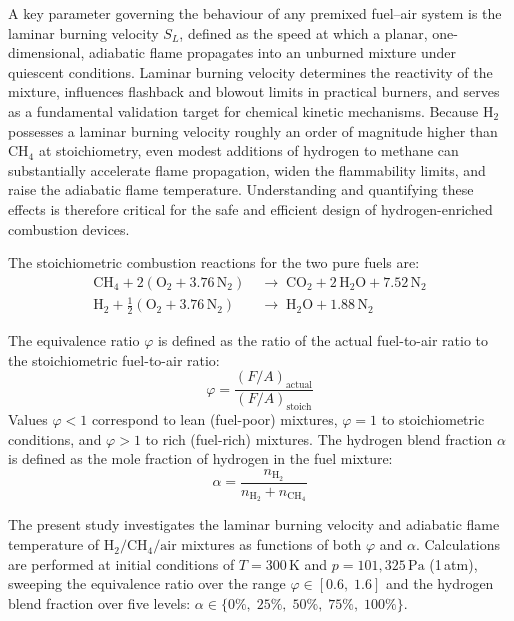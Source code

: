 \documentclass[12pt,a4paper]{article}
\newcommand{\phisym}{\varphi}
\newcommand{\alphasym}{\alpha}
\begin{document}
A key parameter governing the behaviour of any premixed fuel--air system is the laminar burning velocity \(S_L\), defined as the speed at which a planar, one-dimensional, adiabatic flame propagates into an unburned mixture under quiescent conditions. Laminar burning velocity determines the reactivity of the mixture, influences flashback and blowout limits in practical burners, and serves as a fundamental validation target for chemical kinetic mechanisms. Because \(\mathrm{H_2}\) possesses a laminar burning velocity roughly an order of magnitude higher than \(\mathrm{CH_4}\) at stoichiometry, even modest additions of hydrogen to methane can substantially accelerate flame propagation, widen the flammability limits, and raise the adiabatic flame temperature. Understanding and quantifying these effects is therefore critical for the safe and efficient design of hydrogen-enriched combustion devices.

The stoichiometric combustion reactions for the two pure fuels are:
\begin{align}
    \mathrm{CH_4} + 2\left(\mathrm{O_2} + 3.76\,\mathrm{N_2}\right) &\;\longrightarrow\;
    \mathrm{CO_2} + 2\,\mathrm{H_2O} + 7.52\,\mathrm{N_2} \label{eq:ch4} \\[4pt]
    \mathrm{H_2} + \tfrac{1}{2}\left(\mathrm{O_2} + 3.76\,\mathrm{N_2}\right) &\;\longrightarrow\;
    \mathrm{H_2O} + 1.88\,\mathrm{N_2} \label{eq:h2}
\end{align}

The equivalence ratio \(\phisym\) is defined as the ratio of the actual fuel-to-air ratio to the stoichiometric fuel-to-air ratio:
\begin{equation}
    \phisym = \frac{(F/A)_{\text{actual}}}{(F/A)_{\text{stoich}}}
    \label{eq:phi}
\end{equation}
Values \(\phisym < 1\) correspond to lean (fuel-poor) mixtures, \(\phisym = 1\) to stoichiometric conditions, and \(\phisym > 1\) to rich (fuel-rich) mixtures. The hydrogen blend fraction \(\alphasym\) is defined as the mole fraction of hydrogen in the fuel mixture:
\begin{equation}
    \alphasym = \frac{n_{\mathrm{H_2}}}{n_{\mathrm{H_2}} + n_{\mathrm{CH_4}}}
    \label{eq:alpha}
\end{equation}

The present study investigates the laminar burning velocity and adiabatic flame temperature of \(\mathrm{H_2}/\mathrm{CH_4}/\mathrm{air}\) mixtures as functions of both \(\phisym\) and \(\alphasym\). Calculations are performed at initial conditions of \(T = 300\,\mathrm{K}\) and \(p = 101{,}325\,\mathrm{Pa}\) (1\,atm), sweeping the equivalence ratio over the range \(\phisym \in [0.6,\;1.6]\) and the hydrogen blend fraction over five levels: \(\alphasym \in \{0\%,\;25\%,\;50\%,\;75\%,\;100\%\}\).
\end{document}
